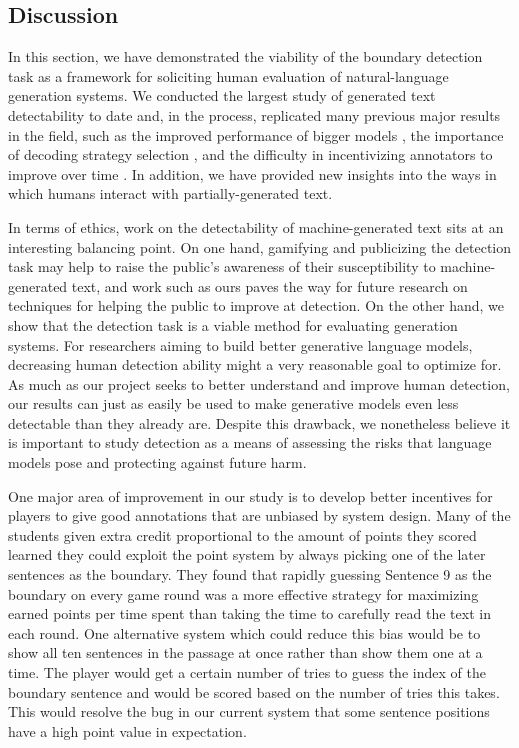 \subsection{Discussion}
\label{section:roft_discussion}
In this section, we have demonstrated the viability of the boundary detection task as a framework for soliciting human evaluation of natural-language generation systems.
We conducted the largest study of generated text detectability to date and, in the process, replicated many previous major results in the field, such as the improved performance of bigger models \citep{kaplan2020scaling}, the importance of decoding strategy selection \citep{ippolito2020automatic}, and the difficulty in incentivizing annotators to improve over time \citep{clark2021all}.
In addition, we have provided new insights into the ways in which humans interact with partially-generated text.

In terms of ethics, work on the detectability of machine-generated text sits at an interesting balancing point.
On one hand, gamifying and publicizing the detection task may help to raise the public's awareness of their susceptibility to machine-generated text, and work such as ours paves the way for future research on techniques for helping the public to improve at detection.
On the other hand, we show that the detection task is a viable method for evaluating generation systems.
For researchers aiming to build better generative language models, decreasing human detection ability might a very reasonable goal to optimize for.
As much as our project seeks to better understand and improve human detection, our results can just as easily be used to make generative models even less detectable than they already are.
Despite this drawback, we nonetheless believe it is important to study detection as a means of assessing the risks that language models pose and protecting against future harm.

One major area of improvement in our study is to develop better incentives for players to give good annotations that are unbiased by system design.
Many of the students given extra credit proportional to the amount of points they scored learned they could exploit the point system by always picking one of the later sentences as the boundary.
They found that rapidly guessing Sentence 9 as the boundary on every game round was a more effective strategy for maximizing earned points per time spent than taking the time to carefully read the text in each round.
One alternative system which could reduce this bias would be to show all ten sentences in the passage at once rather than show them one at a time.
The player would get a certain number of tries to guess the index of the boundary sentence and would be scored based on the number of tries this takes.
This would resolve the bug in our current system that some sentence positions have a high point value in expectation.

